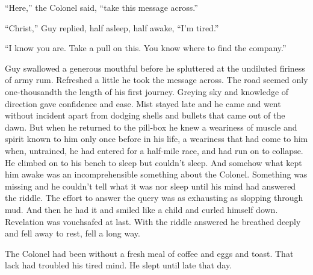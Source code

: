``Here,'' the Colonel said, ``take this message across.''

``Christ,'' Guy replied, half asleep, half awake, ``I'm tired.''

``I know you are. Take a pull on this. You know where to find the company.''

Guy swallowed a generous mouthful before he spluttered at the undiluted firiness of army rum. Refreshed a little he took the message across. The road seemed only one-thousandth the length of his first journey. Greying sky and knowledge of direction gave confidence and ease. Mist stayed late and he came and went without incident apart from dodging shells and bullets that came out of the dawn. But when he returned to the pill-box he knew a weariness of muscle and spirit known to him only once before in his life, a weariness that had come to him when, untrained, he had entered for a half-mile race, and had run on to collapse. He climbed on to his bench to sleep but couldn't sleep. And somehow what kept him awake was an incomprehensible something about the Colonel. Something was missing and he couldn't tell what it was nor sleep until his mind had answered the riddle. The effort to answer the query was as exhausting as slopping through mud. And then he had it and smiled like a child and curled himself down. Revelation was vouchsafed at last. With the riddle answered he breathed deeply and fell away to rest, fell a long way.

The Colonel had been without a fresh meal of coffee and eggs and toast. That lack had troubled his tired mind. He slept until late that day.
